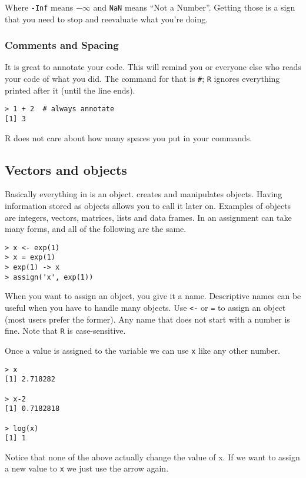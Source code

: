 Where \texttt{-Inf} means $-\infty$ and \texttt{NaN} means ``Not a Number''. Getting those is a sign that you need to stop and reevaluate what you're doing.

\subsubsection*{Comments and Spacing}

It is great to annotate your code. This will remind you or everyone else who reads your code of what you did. The command for that is \texttt{\#}; \texttt{R} ignores everything printed after it (until the line ends).

\begin{lstlisting}
> 1 + 2  # always annotate
[1] 3
\end{lstlisting}

\textsf{R} does not care about how many spaces you put in your commands.

\subsection{Vectors and objects}

Basically everything in \R is an object. \R creates and manipulates objects. Having information stored as objects allows you to call it later on. Examples of objects are integers, vectors, matrices, lists and data frames. In \R an assignment can take many forms, and all of the following are the same.

\begin{lstlisting}
> x <- exp(1)
> x = exp(1)
> exp(1) -> x
> assign('x', exp(1))
\end{lstlisting}

When you want to assign an object, you give it a name. Descriptive names can be useful when you have to handle many objects. Use \texttt{<-} or \texttt{=} to assign an object (most \R users prefer the former). Any name that does not start with a number is fine. Note that \texttt{R} is case-sensitive.

Once a value is assigned to the variable we can use \texttt{x} like any other number.

\begin{lstlisting}
> x
[1] 2.718282

> x-2
[1] 0.7182818

> log(x)
[1] 1
\end{lstlisting}

Notice that none of the above actually change the value of x. If we want to assign a new value to \texttt{x} we just use the arrow again.

